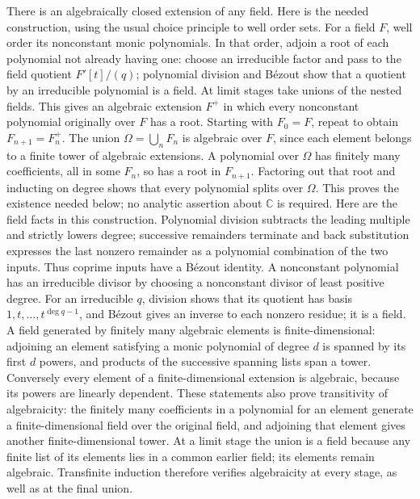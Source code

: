\documentclass[11pt,a4paper,openany]{report}
\begin{document}
There is an algebraically closed extension of any field. Here is the needed construction, using the usual choice principle to well order sets. For a field \(F\), well order its nonconstant monic polynomials. In that order, adjoin a root of each polynomial not already having one: choose an irreducible factor and pass to the field quotient \(F'[t]/(q)\); polynomial division and Bézout show that a quotient by an irreducible polynomial is a field. At limit stages take unions of the nested fields. This gives an algebraic extension \(F^+\) in which every nonconstant polynomial originally over \(F\) has a root. Starting with \(F_0=F\), repeat to obtain \(F_{n+1}=F_n^+\). The union \(\Omega=\bigcup_nF_n\) is algebraic over \(F\), since each element belongs to a finite tower of algebraic extensions. A polynomial over \(\Omega\) has finitely many coefficients, all in some \(F_n\), so has a root in \(F_{n+1}\). Factoring out that root and inducting on degree shows that every polynomial splits over \(\Omega\). This proves the existence needed below; no analytic assertion about \(\mathbb C\) is required. Here are the field facts in this construction. Polynomial division subtracts the leading multiple and strictly lowers degree; successive remainders terminate and back substitution expresses the last nonzero remainder as a polynomial combination of the two inputs. Thus coprime inputs have a Bézout identity. A nonconstant polynomial has an irreducible divisor by choosing a nonconstant divisor of least positive degree. For an irreducible \(q\), division shows that its quotient has basis \(1,t,\ldots,t^{\deg q-1}\), and Bézout gives an inverse to each nonzero residue; it is a field. A field generated by finitely many algebraic elements is finite-dimensional: adjoining an element satisfying a monic polynomial of degree \(d\) is spanned by its first \(d\) powers, and products of the successive spanning lists span a tower. Conversely every element of a finite-dimensional extension is algebraic, because its powers are linearly dependent. These statements also prove transitivity of algebraicity: the finitely many coefficients in a polynomial for an element generate a finite-dimensional field over the original field, and adjoining that element gives another finite-dimensional tower. At a limit stage the union is a field because any finite list of its elements lies in a common earlier field; its elements remain algebraic. Transfinite induction therefore verifies algebraicity at every stage, as well as at the final union.
\end{document}
